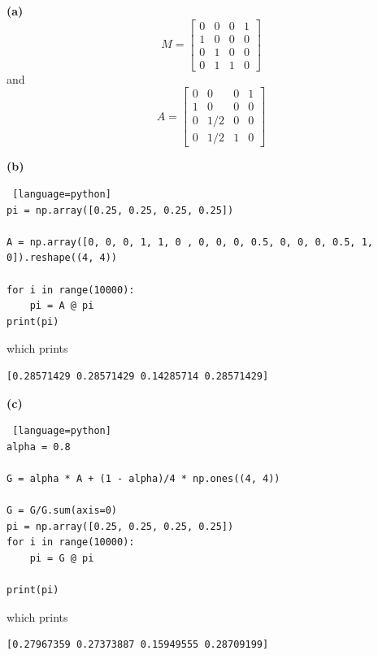 \documentclass[a4paper, 12pt]{article}
\begin{document}
\begin{problem} [Problem 2]
\end{problem}
\begin{solution}
    \textbf{(a)} 
    \[
    M = \begin{bmatrix}
    0 & 0 & 0 & 1 \\
    1 & 0 & 0 & 0 \\
    0 & 1 & 0 & 0 \\
    0 & 1 & 1 & 0
    \end{bmatrix}
    \]
    and \[
    A =  \begin{bmatrix}
        0 & 0 & 0 & 1 \\
        1 & 0 & 0 & 0 \\
        0 & 1/2 & 0 & 0 \\
        0 & 1/2 & 1 & 0
        \end{bmatrix}
    \]

    \textbf{(b)}    

\begin{lstlisting} [language=python]
pi = np.array([0.25, 0.25, 0.25, 0.25])

A = np.array([0, 0, 0, 1, 1, 0 , 0, 0, 0, 0.5, 0, 0, 0, 0.5, 1, 0]).reshape((4, 4))

for i in range(10000):
    pi = A @ pi
print(pi)
\end{lstlisting}
    which prints
\begin{lstlisting}
[0.28571429 0.28571429 0.14285714 0.28571429]
\end{lstlisting}

\textbf{(c)}    
\begin{lstlisting} [language=python]
alpha = 0.8

G = alpha * A + (1 - alpha)/4 * np.ones((4, 4))

G = G/G.sum(axis=0)
pi = np.array([0.25, 0.25, 0.25, 0.25])
for i in range(10000):
    pi = G @ pi

print(pi)
\end{lstlisting}
which prints
\begin{lstlisting}
[0.27967359 0.27373887 0.15949555 0.28709199]
\end{lstlisting}


\end{solution}
\end{document}
